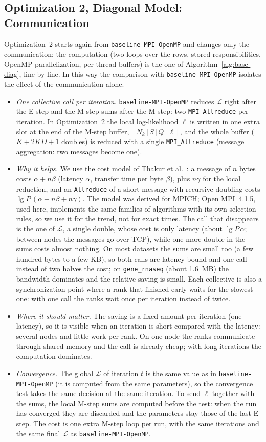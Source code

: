 \documentclass[conference,onecolumn]{IEEEtran}
\newcommand{\vbase}{\texttt{baseline-\allowbreak MPI-\allowbreak OpenMP}}
\begin{document}
\subsection{Optimization 2, Diagonal Model: Communication}
Optimization~2 starts again from \vbase{} and changes only the communication: the computation (two loops over the rows, stored responsibilities, OpenMP parallelization, per-thread buffers) is the one of Algorithm~\ref{alg:base-diag}, line by line. In this way the comparison with \vbase{} isolates the effect of the communication alone.
\begin{itemize}
\item \emph{One collective call per iteration.} \vbase{} reduces $\mathcal{L}$ right after the E-step and the M-step sums after the M-step: two \texttt{MPI\_Allreduce} per iteration. In Optimization~2 the local log-likelihood $\ell$ is written in one extra slot at the end of the M-step buffer, $[N_k\,|\,S\,|\,Q\,|\,\ell]$, and the whole buffer ($K+2KD+1$ doubles) is reduced with a single \texttt{MPI\_Allreduce} (message aggregation: two messages become one).
\item \emph{Why it helps.} We use the cost model of Thakur et al.~\cite{thakur}: a message of $n$ bytes costs $\alpha+n\beta$ (latency $\alpha$, transfer time per byte $\beta$), plus $n\gamma$ for the local reduction, and an \texttt{Allreduce} of a short message with recursive doubling costs $\lg P\,(\alpha+n\beta+n\gamma)$. The model was derived for MPICH; Open MPI~4.1.5, used here, implements the same families of algorithms with its own selection rules, so we use it for the trend, not for exact times. The call that disappears is the one of $\mathcal{L}$, a single double, whose cost is only latency (about $\lg P\,\alpha$; between nodes the messages go over TCP), while one more double in the sums costs almost nothing. On most datasets the sums are small too (a few hundred bytes to a few KB), so both calls are latency-bound and one call instead of two halves the cost; on \texttt{gene\_rnaseq} (about 1.6~MB) the bandwidth dominates and the relative saving is small. Each collective is also a synchronization point where a rank that finished early waits for the slowest one: with one call the ranks wait once per iteration instead of twice.
\item \emph{Where it should matter.} The saving is a fixed amount per iteration (one latency), so it is visible when an iteration is short compared with the latency: several nodes and little work per rank. On one node the ranks communicate through shared memory and the call is already cheap; with long iterations the computation dominates.
\item \emph{Convergence.} The global $\mathcal{L}$ of iteration $t$ is the same value as in \vbase{} (it is computed from the same parameters), so the convergence test takes the same decision at the same iteration. To send $\ell$ together with the sums, the local M-step sums are computed before the test: when the run has converged they are discarded and the parameters stay those of the last E-step. The cost is one extra M-step loop per run, with the same iterations and the same final $\mathcal{L}$ as \vbase{}.
\end{itemize}
\end{document}
